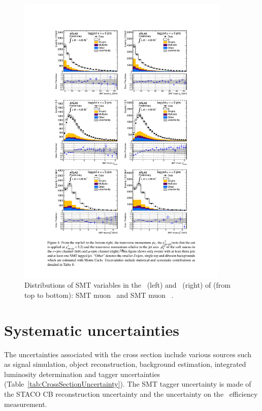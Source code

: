 \begin{figure}[htbp]
  \centering
    \includegraphics[width=0.90\textwidth]{PartCrossSection/Plots/h_stacks_elmu_SMT_pars.pdf}
    \caption[Distributions of SMT variables in the \ejets\ (left) and \mujets\ (right) of (from top to bottom): SMT muon \pt\ and SMT muon \xsd.]{Distributions of SMT variables in the \ejets\ (left) and \mujets\ (right) of (from top to bottom): SMT muon \pt\ and SMT muon \xsd~\cite{Cross:SMTCrossSectionPaper}.}
  \label{fig:CrossBackgroundSMTShapes}
\end{figure}


\section{Systematic uncertainties} \label{sec:systematics_uncertainties}

The uncertainties associated with the cross section include various sources such as signal simulation, object reconstruction, background estimation, integrated luminosity determination and tagger uncertainties (Table~\ref{tab:CrossSectionUncertainty}). The SMT tagger uncertainty is made of the STACO CB reconstruction uncertainty and the uncertainty on the \xsm\ efficiency measurement. 

